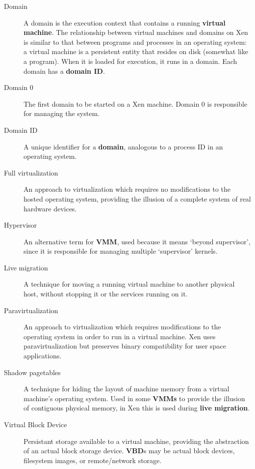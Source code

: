 \documentclass[11pt,twoside,final,openright]{report}
\begin{document}
\begin{description}

\item[Domain] A domain is the execution context that contains a
  running {\bf virtual machine}.  The relationship between virtual
  machines and domains on Xen is similar to that between programs and
  processes in an operating system: a virtual machine is a persistent
  entity that resides on disk (somewhat like a program).  When it is
  loaded for execution, it runs in a domain.  Each domain has a {\bf
    domain ID}.

\item[Domain 0] The first domain to be started on a Xen machine.
  Domain 0 is responsible for managing the system.

\item[Domain ID] A unique identifier for a {\bf domain}, analogous to
  a process ID in an operating system.

\item[Full virtualization] An approach to virtualization which
  requires no modifications to the hosted operating system, providing
  the illusion of a complete system of real hardware devices.

\item[Hypervisor] An alternative term for {\bf VMM}, used because it
  means `beyond supervisor', since it is responsible for managing
  multiple `supervisor' kernels.

\item[Live migration] A technique for moving a running virtual machine
  to another physical host, without stopping it or the services
  running on it.

\item[Paravirtualization] An approach to virtualization which requires
  modifications to the operating system in order to run in a virtual
  machine.  Xen uses paravirtualization but preserves binary
  compatibility for user space applications.

\item[Shadow pagetables] A technique for hiding the layout of machine
  memory from a virtual machine's operating system.  Used in some {\bf
  VMMs} to provide the illusion of contiguous physical memory, in
  Xen this is used during {\bf live migration}.

\item[Virtual Block Device] Persistant storage available to a virtual
  machine, providing the abstraction of an actual block storage device.
  {\bf VBD}s may be actual block devices, filesystem images, or
  remote/network storage.


\end{description}
\end{document}
